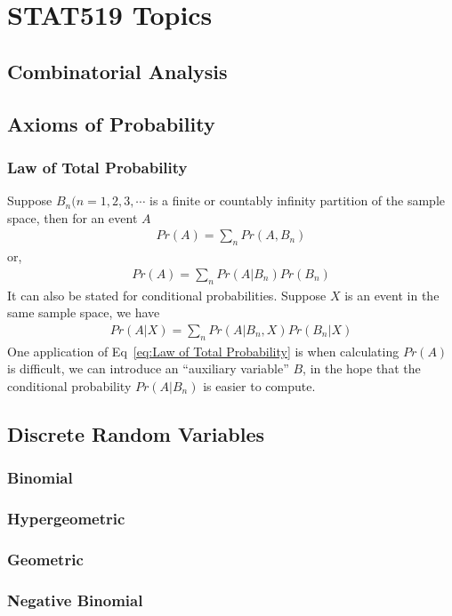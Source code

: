 \part{STAT519 Topics}

\chapter{Combinatorial Analysis}

\chapter{Axioms of Probability}
\section{Law of Total Probability}
Suppose $B_n (n=1,2,3,\cdots$ is a finite or countably infinity partition of the sample space, then for an event $A$
\begin{align}
	Pr(A) = \sum_n Pr(A,B_n)
\end{align}
or,
\begin{align}\label{eq:Law of Total Probability}
	Pr(A) = \sum_n Pr(A|B_n) Pr(B_n)
\end{align}
It can also be stated for conditional probabilities. Suppose $X$ is an event in the same sample space, we have
\begin{align}
	Pr(A|X) = \sum_n Pr(A|B_n,X)Pr(B_n|X)
\end{align}
One application of Eq~\ref{eq:Law of Total Probability} is when calculating $Pr(A)$ is difficult, we can introduce an ``auxiliary variable'' $B$, in the hope that the conditional probability $Pr(A|B_n)$ is easier to compute.

\chapter{Discrete Random Variables}
\section{Binomial}
\section{Hypergeometric}
\section{Geometric}
\section{Negative Binomial}
